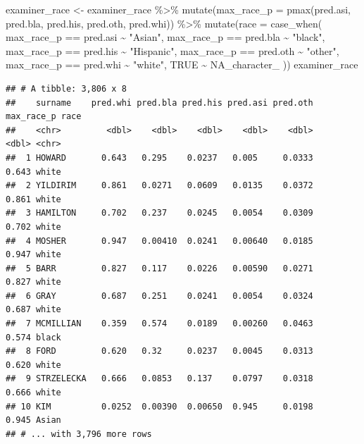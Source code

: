 \documentclass[
]{article}
\newenvironment{Shaded}{\begin{snugshade}}{\end{snugshade}}
\newcommand{\AttributeTok}[1]{\textcolor[rgb]{0.77,0.63,0.00}{#1}}
\newcommand{\ConstantTok}[1]{\textcolor[rgb]{0.00,0.00,0.00}{#1}}
\newcommand{\FunctionTok}[1]{\textcolor[rgb]{0.00,0.00,0.00}{#1}}
\newcommand{\NormalTok}[1]{#1}
\newcommand{\OtherTok}[1]{\textcolor[rgb]{0.56,0.35,0.01}{#1}}
\newcommand{\SpecialCharTok}[1]{\textcolor[rgb]{0.00,0.00,0.00}{#1}}
\newcommand{\StringTok}[1]{\textcolor[rgb]{0.31,0.60,0.02}{#1}}
\begin{document}
\begin{Shaded}
\begin{Highlighting}[]
\NormalTok{examiner\_race }\OtherTok{\textless{}{-}}\NormalTok{ examiner\_race }\SpecialCharTok{\%\textgreater{}\%} 
  \FunctionTok{mutate}\NormalTok{(}\AttributeTok{max\_race\_p =} \FunctionTok{pmax}\NormalTok{(pred.asi, pred.bla, pred.his, pred.oth, pred.whi)) }\SpecialCharTok{\%\textgreater{}\%} 
  \FunctionTok{mutate}\NormalTok{(}\AttributeTok{race =} \FunctionTok{case\_when}\NormalTok{(}
\NormalTok{    max\_race\_p }\SpecialCharTok{==}\NormalTok{ pred.asi }\SpecialCharTok{\textasciitilde{}} \StringTok{"Asian"}\NormalTok{,}
\NormalTok{    max\_race\_p }\SpecialCharTok{==}\NormalTok{ pred.bla }\SpecialCharTok{\textasciitilde{}} \StringTok{"black"}\NormalTok{,}
\NormalTok{    max\_race\_p }\SpecialCharTok{==}\NormalTok{ pred.his }\SpecialCharTok{\textasciitilde{}} \StringTok{"Hispanic"}\NormalTok{,}
\NormalTok{    max\_race\_p }\SpecialCharTok{==}\NormalTok{ pred.oth }\SpecialCharTok{\textasciitilde{}} \StringTok{"other"}\NormalTok{,}
\NormalTok{    max\_race\_p }\SpecialCharTok{==}\NormalTok{ pred.whi }\SpecialCharTok{\textasciitilde{}} \StringTok{"white"}\NormalTok{,}
    \ConstantTok{TRUE} \SpecialCharTok{\textasciitilde{}} \ConstantTok{NA\_character\_}
\NormalTok{  ))}
\NormalTok{examiner\_race}
\end{Highlighting}
\end{Shaded}

\begin{verbatim}
## # A tibble: 3,806 x 8
##    surname    pred.whi pred.bla pred.his pred.asi pred.oth max_race_p race 
##    <chr>         <dbl>    <dbl>    <dbl>    <dbl>    <dbl>      <dbl> <chr>
##  1 HOWARD       0.643   0.295    0.0237   0.005     0.0333      0.643 white
##  2 YILDIRIM     0.861   0.0271   0.0609   0.0135    0.0372      0.861 white
##  3 HAMILTON     0.702   0.237    0.0245   0.0054    0.0309      0.702 white
##  4 MOSHER       0.947   0.00410  0.0241   0.00640   0.0185      0.947 white
##  5 BARR         0.827   0.117    0.0226   0.00590   0.0271      0.827 white
##  6 GRAY         0.687   0.251    0.0241   0.0054    0.0324      0.687 white
##  7 MCMILLIAN    0.359   0.574    0.0189   0.00260   0.0463      0.574 black
##  8 FORD         0.620   0.32     0.0237   0.0045    0.0313      0.620 white
##  9 STRZELECKA   0.666   0.0853   0.137    0.0797    0.0318      0.666 white
## 10 KIM          0.0252  0.00390  0.00650  0.945     0.0198      0.945 Asian
## # ... with 3,796 more rows
\end{verbatim}
\end{document}
